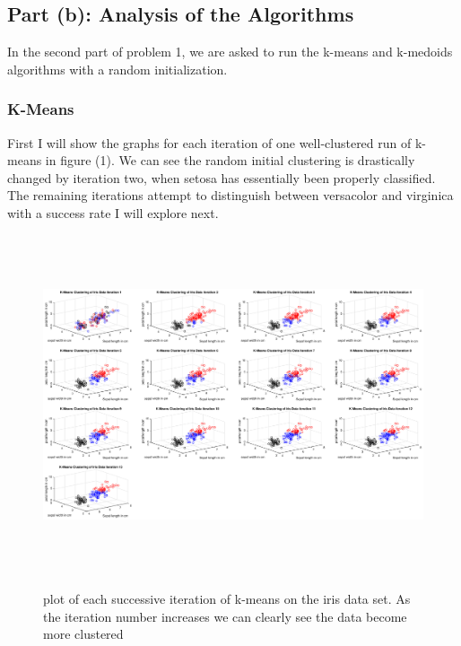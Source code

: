 \documentclass{article}
\begin{document}
\subsection*{Part (b): Analysis of the Algorithms}
    In the second part of problem 1, we are asked to run the k-means and k-medoids algorithms with a random initialization.  
   \subsubsection*{K-Means}
    First I will show the graphs for each iteration of one well-clustered run of k-means in figure (1). We can see the random initial clustering is drastically changed by iteration two, when setosa has essentially been properly classified.  The remaining iterations attempt to distinguish between versacolor and virginica with a success rate I will explore next.
    \begin{figure}[h!]
    \centerline
    {
    \includegraphics[width=20cm, height=10cm]{kmeans_iterations}\\
    }
    \caption{\label{fig:my figure} plot of each successive iteration of k-means on the iris data set.  As the iteration number increases we can clearly see the data become more clustered}
    \end{figure}
\end{document}

